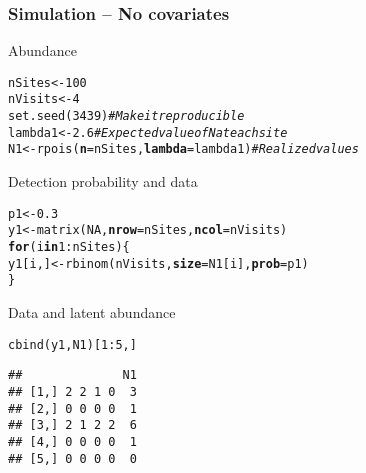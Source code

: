 \documentclass[color=usenames,dvipsnames]{beamer}\usepackage[]{graphicx}\usepackage[]{xcolor}
\makeatletter
\newcommand{\hlnum}[1]{\textcolor[rgb]{0.69,0.494,0}{#1}}%
\newcommand{\hlcom}[1]{\textcolor[rgb]{0.514,0.506,0.514}{\textit{#1}}}%
\newcommand{\hlopt}[1]{\textcolor[rgb]{0,0,0}{#1}}%
\newcommand{\hldef}[1]{\textcolor[rgb]{0,0,0}{#1}}%
\newcommand{\hlkwa}[1]{\textcolor[rgb]{0,0,0}{\textbf{#1}}}%
\newcommand{\hlkwb}[1]{\textcolor[rgb]{0,0.341,0.682}{#1}}%
\newcommand{\hlkwc}[1]{\textcolor[rgb]{0,0,0}{\textbf{#1}}}%
\newcommand{\hlkwd}[1]{\textcolor[rgb]{0.004,0.004,0.506}{#1}}%
\newenvironment{kframe}{%
 \def\at@end@of@kframe{}%
 \ifinner\ifhmode%
  \def\at@end@of@kframe{\end{minipage}}%
  \begin{minipage}{\columnwidth}%
 \fi\fi%
 \def\FrameCommand##1{\hskip\@totalleftmargin \hskip-\fboxsep
 \colorbox{shadecolor}{##1}\hskip-\fboxsep
     \hskip-\linewidth \hskip-\@totalleftmargin \hskip\columnwidth}%
 \MakeFramed {\advance\hsize-\width
   \@totalleftmargin\z@ \linewidth\hsize
   \@setminipage}}%
 {\par\unskip\endMakeFramed%
 \at@end@of@kframe}
\newenvironment{knitrout}{}{} %
\makeatother
\begin{document}
\begin{frame}[fragile]
  \frametitle{Simulation -- No covariates}
  \small
  Abundance
\begin{knitrout}\scriptsize
{}\color{fgcolor}\begin{kframe}
\begin{alltt}
\hldef{nSites} \hlkwb{<-} \hlnum{100}
\hldef{nVisits} \hlkwb{<-} \hlnum{4}
\hlkwd{set.seed}\hldef{(}\hlnum{3439}\hldef{)}                         \hlcom{# Make it reproducible}
\hldef{lambda1} \hlkwb{<-} \hlnum{2.6}                         \hlcom{# Expected value of N at each site}
\hldef{N1} \hlkwb{<-} \hlkwd{rpois}\hldef{(}\hlkwc{n}\hldef{=nSites,} \hlkwc{lambda}\hldef{=lambda1)}  \hlcom{# Realized values}
\end{alltt}
\end{kframe}
\end{knitrout}
  \pause
  \vfill
  Detection probability and data
\begin{knitrout}\scriptsize
{}\color{fgcolor}\begin{kframe}
\begin{alltt}
\hldef{p1} \hlkwb{<-} \hlnum{0.3}
\hldef{y1} \hlkwb{<-} \hlkwd{matrix}\hldef{(}\hlnum{NA}\hldef{,} \hlkwc{nrow}\hldef{=nSites,} \hlkwc{ncol}\hldef{=nVisits)}
\hlkwa{for}\hldef{(i} \hlkwa{in} \hlnum{1}\hlopt{:}\hldef{nSites) \{}
    \hldef{y1[i,]} \hlkwb{<-} \hlkwd{rbinom}\hldef{(nVisits,} \hlkwc{size}\hldef{=N1[i],} \hlkwc{prob}\hldef{=p1)}
\hldef{\}}
\end{alltt}
\end{kframe}
\end{knitrout}
  \pause
  \vfill
  Data and latent abundance
\begin{knitrout}\scriptsize
{}\color{fgcolor}\begin{kframe}
\begin{alltt}
\hlkwd{cbind}\hldef{(y1, N1)[}\hlnum{1}\hlopt{:}\hlnum{5}\hldef{,]}
\end{alltt}
\begin{verbatim}
##              N1
## [1,] 2 2 1 0  3
## [2,] 0 0 0 0  1
## [3,] 2 1 2 2  6
## [4,] 0 0 0 0  1
## [5,] 0 0 0 0  0
\end{verbatim}
\end{kframe}
\end{knitrout}
\end{frame}
\end{document}
